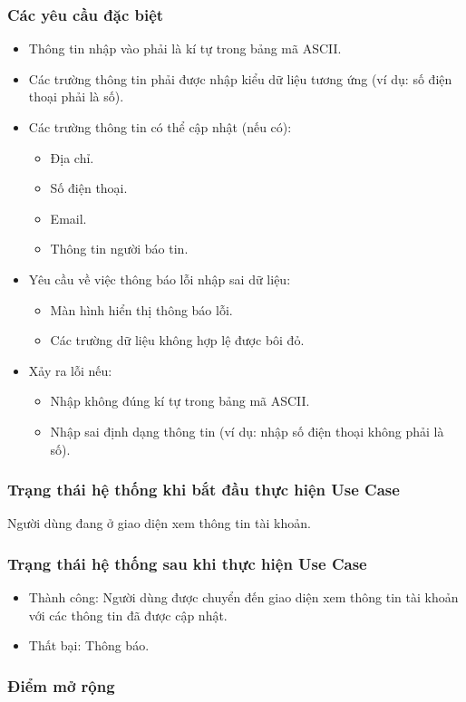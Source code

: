 \subsubsection{Các yêu cầu đặc biệt}
\begin{itemize}
  \item Thông tin nhập vào phải là kí tự trong bảng mã ASCII.
  \item Các trường thông tin phải được nhập kiểu dữ liệu tương ứng (ví dụ: số điện thoại phải là số).
  \item Các trường thông tin có thể cập nhật (nếu có):
    \begin{itemize}
      \item Địa chỉ.
      \item Số điện thoại.
      \item Email.
      \item Thông tin người báo tin.
    \end{itemize}
  \item Yêu cầu về việc thông báo lỗi nhập sai dữ liệu:
    \begin{itemize}
      \item Màn hình hiển thị thông báo lỗi.
      \item Các trường dữ liệu không hợp lệ được bôi đỏ.
    \end{itemize}
  \item Xảy ra lỗi nếu:
    \begin{itemize}
      \item Nhập không đúng kí tự trong bảng mã ASCII.
      \item Nhập sai định dạng thông tin (ví dụ: nhập số điện thoại không phải là số).
    \end{itemize}
\end{itemize}

\subsubsection{Trạng thái hệ thống khi bắt đầu thực hiện Use Case}
Người dùng đang ở giao diện xem thông tin tài khoản.

\subsubsection{Trạng thái hệ thống sau khi thực hiện Use Case}
\begin{itemize}
  \item Thành công: Người dùng được chuyển đến giao diện xem thông tin tài khoản với các thông tin đã được cập nhật.
  \item Thất bại: Thông báo.
\end{itemize}

\subsubsection{Điểm mở rộng}